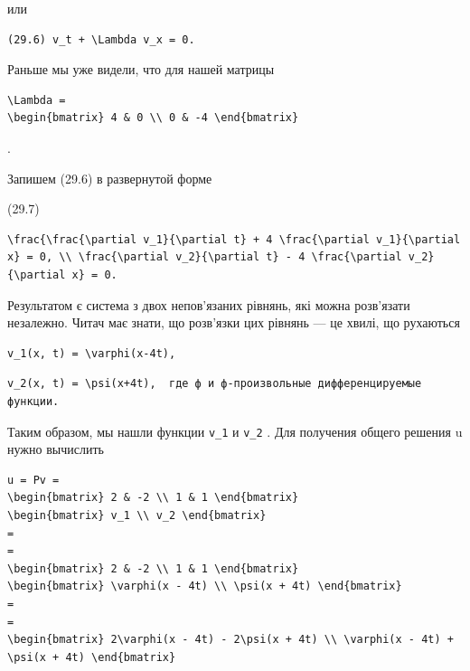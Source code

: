 \documentclass[
  ukrainian,
]{article}
\begin{document}
или

\begin{verbatim}
(29.6) v_t + \Lambda v_x = 0.
\end{verbatim}

Раньше мы уже видели, что для нашей матрицы

\begin{verbatim}
\Lambda =
\begin{bmatrix} 4 & 0 \\ 0 & -4 \end{bmatrix}
\end{verbatim}

.

Запишем (29.6) в развернутой форме

(29.7)

\begin{verbatim}
\frac{\frac{\partial v_1}{\partial t} + 4 \frac{\partial v_1}{\partial x} = 0, \\ \frac{\partial v_2}{\partial t} - 4 \frac{\partial v_2}{\partial x} = 0.
\end{verbatim}

Результатом є система з двох непов'язаних рівнянь, які можна розв'язати
незалежно. Читач має знати, що розв'язки цих рівнянь --- це хвилі, що
рухаються

\begin{verbatim}
v_1(x, t) = \varphi(x-4t),
\end{verbatim}

\begin{verbatim}
v_2(x, t) = \psi(x+4t),  где ф и ф-произвольные дифференцируемые функции.
\end{verbatim}

Таким образом, мы нашли функции \texttt{v\_1} и \texttt{v\_2} . Для
получения общего решения u нужно вычислить

\begin{verbatim}
u = Pv =
\begin{bmatrix} 2 & -2 \\ 1 & 1 \end{bmatrix}
\begin{bmatrix} v_1 \\ v_2 \end{bmatrix}
=
=
\begin{bmatrix} 2 & -2 \\ 1 & 1 \end{bmatrix}
\begin{bmatrix} \varphi(x - 4t) \\ \psi(x + 4t) \end{bmatrix}
=
=
\begin{bmatrix} 2\varphi(x - 4t) - 2\psi(x + 4t) \\ \varphi(x - 4t) + \psi(x + 4t) \end{bmatrix}
\end{verbatim}
\end{document}

